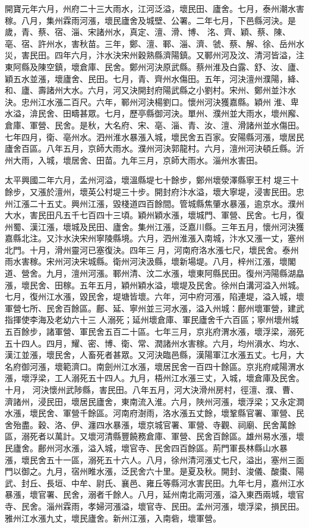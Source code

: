 \begin{pinyinscope}
 開寶元年六月，州府二十三大雨水，江河泛溢，壞民田、廬舍。七月，泰州潮水害稼。八月，集州霖雨河漲，壞民廬舍及城壁、公署。二年七月，下邑縣河決。是歲，青、蔡、宿、淄、宋諸州水，真定、澶、滑、博、
 洺、齊、穎、蔡、陳、亳、宿、許州水，害秋苗。三年，鄭、澶、鄆、淄、濟、虢、蔡、解、徐、岳州水災，害民田。四年六月，汴水決宋州穀熟縣濟陽鎮。又鄆州河及汶、清河皆溢，注東阿縣及陳空鎮，壞倉庫、民舍。鄭州河決原武縣。蔡州淮及白露、舒、汝、廬、穎五水並漲，壞廬舍、民田。七月，青、齊州水傷田。五年，河決澶州濮陽，絳、和、廬、壽諸州大水。六月，河又決開封府陽武縣之小劉村。宋州、鄭州並汴水決。忠州江水漲二百尺。六年，鄆州河決楊劉口。懷州河決獲嘉縣。穎州
 淮、卑水溢，渰民舍、田疇甚眾。七月，歷亭縣御河決。單州、濮州並大雨水，壞州廨、倉庫、軍營、民舍。是秋，大名府、宋、亳、淄、青、汝、澶、滑諸州並水傷田。七年四月，衛、亳州水。泗州淮水暴漲入城，壞民舍五百家。安陽縣河漲，壞居民廬舍百區。八年五月，京師大雨水。濮州河決郭龍村。六月，澶州河決頓丘縣。沂州大雨，入城，壞居舍、田苗。九年三月，京師大雨水。淄州水害田。



 太平興國二年六月，孟州河溢，壞溫縣堤七十餘步，鄭州壞滎澤縣寧王村
 堤三十餘步，又漲於澶州，壞英公村堤三十步。開封府汴水溢，壞大寧堤，浸害民田。忠州江漲二十五丈。興州江漲，毀棧道四百餘間。管城縣焦肇水暴漲，逾京水。濮州大水，害民田凡五千七百四十三頃。穎州穎水漲，壞城門、軍營、民舍。七月，復州蜀、漢江漲，壞城及民田、廬舍。集州江漲，泛嘉川縣。三年五月，懷州河決獲嘉縣北注。又汴水決宋州寧陵縣境。六月，泗州淮漲入南城，汴水又漲一丈，塞州北門。十月，滑州靈河已塞復決。四年三
 月，河南府洛水漲七尺，壞民舍。泰州雨水害稼。宋州河決宋城縣。衛州河決汲縣，壞新場堤。八月，梓州江漲，壞閣道、營舍。九月，澶州河漲。鄆州清、汶二水漲，壞東阿縣民田。復州沔陽縣湖皛漲，壞民舍、田稼。五年五月，穎州穎水溢，壞堤及民舍。徐州白溝河溢入州城。七月，復州江水漲，毀民舍，堤塘皆壞。六年，河中府河漲，陷連堤，溢入城，壞軍營七所、民舍百餘區。鄜、延、寧州並三河水漲，溢入州城：鄜州壞軍營，建武指揮使李海及老幼六十三
 人溺死；延州壞倉庫、軍民廬舍千六百區；寧州壞州城五百餘步，諸軍營、軍民舍五百二十區。七年三月，京兆府渭水漲，壞浮梁，溺死五十四人。四月，耀、密、博、衛、常、潤諸州水害稼。六月，均州溳水、均水、漢江並漲，壞民舍，人畜死者甚眾。又河決臨邑縣，漢陽軍江水漲五丈。七月，大名府御河漲，壞範濟口。南劍州江水漲，壞居民舍一百四十餘區。京兆府咸陽渭水漲，壞浮梁，工人溺死五十四人。九月，梧州江水漲三丈，入城，壞倉庫及民舍。十月，
 河決懷州武陟縣，害民田。八年五月，河大決滑州房村，徑澶、濮、曹、濟諸州，浸民田，壞居民廬舍，東南流入淮。六月，陜州河漲，壞浮梁；又永定澗水漲，壞民舍、軍營千餘區。河南府澍雨，洛水漲五丈餘，壞鞏縣官署、軍營、民舍殆盡。穀、洛、伊、瀍四水暴漲，壞京城官署、軍營、寺觀、祠廟、民舍萬餘區，溺死者以萬計。又壞河清縣豐饒務倉庫、軍營、民舍百餘區。雄州易水漲，壞民廬舍。鄜州河水漲，溢入城，壞官寺、民舍四百餘區。荊門軍長林縣山水暴
 漲，壞民舍五十一區，溺死五十六人。八月，徐州清河漲丈七尺，溢出，塞州三面門以御之。九月，宿州睢水漲，泛民舍六十里。是夏及秋。開封、浚儀、酸棗、陽武、封丘、長垣、中牟、尉氏、襄邑、雍丘等縣河水害民田。九年七月，嘉州江水暴漲，壞官署、民舍，溺者千餘人。八月，延州南北兩河漲，溢入東西兩城，壞官寺、民舍。淄州霖雨，孝婦河漲溢，壞官寺、民田。孟州河漲，壞浮梁，損民田。雅州江水漲九丈，壞民廬舍。新州江漲，入南砦，壞軍營。




\end{pinyinscope}

